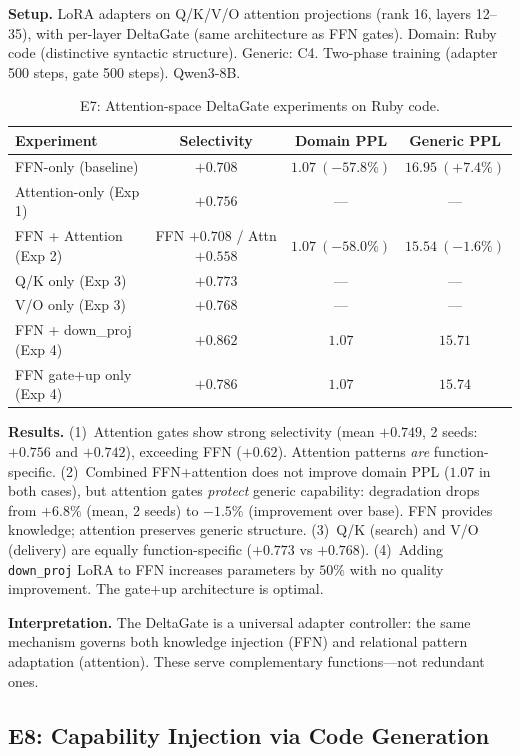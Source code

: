 \documentclass{article}
\begin{document}
\textbf{Setup.} LoRA adapters on Q/K/V/O attention projections (rank 16,
layers 12--35), with per-layer DeltaGate (same architecture as FFN gates).
Domain: Ruby code (distinctive syntactic structure). Generic: C4.
Two-phase training (adapter 500 steps, gate 500 steps). Qwen3-8B.

\begin{table}[h]
\centering
\caption{E7: Attention-space DeltaGate experiments on Ruby code.}
\label{tab:e7}
\begin{tabular}{@{}lccc@{}}
\toprule
Experiment & Selectivity & Domain PPL & Generic PPL \\
\midrule
FFN-only (baseline) & $+0.708$ & $1.07\ (-57.8\%)$ & $16.95\ (+7.4\%)$ \\
Attention-only (Exp 1) & $+0.756$ & --- & --- \\
FFN + Attention (Exp 2) & FFN $+0.708$ / Attn $+0.558$ & $1.07\ (-58.0\%)$ & $15.54\ (-1.6\%)$ \\
Q/K only (Exp 3) & $+0.773$ & --- & --- \\
V/O only (Exp 3) & $+0.768$ & --- & --- \\
FFN + down\_proj (Exp 4) & $+0.862$ & $1.07$ & $15.71$ \\
FFN gate+up only (Exp 4) & $+0.786$ & $1.07$ & $15.74$ \\
\bottomrule
\end{tabular}
\end{table}

\textbf{Results.} (1)~Attention gates show strong selectivity (mean
$+0.749$, 2 seeds: $+0.756$ and $+0.742$), exceeding FFN ($+0.62$).
Attention patterns \emph{are} function-specific. (2)~Combined FFN+attention does not improve domain PPL
($1.07$ in both cases), but attention gates \emph{protect} generic
capability: degradation drops from $+6.8\%$ (mean, 2 seeds)
to $-1.5\%$ (improvement over base). FFN provides
knowledge; attention preserves generic structure. (3)~Q/K (search) and
V/O (delivery) are equally function-specific ($+0.773$ vs $+0.768$).
(4)~Adding \texttt{down\_proj} LoRA to FFN increases parameters by $50\%$
with no quality improvement. The gate+up architecture is optimal.

\textbf{Interpretation.} The DeltaGate is a universal adapter controller:
the same mechanism governs both knowledge injection (FFN) and relational
pattern adaptation (attention). These serve complementary functions---not
redundant ones.

\subsection{E8: Capability Injection via Code Generation}
\label{sec:e8}
\end{document}
